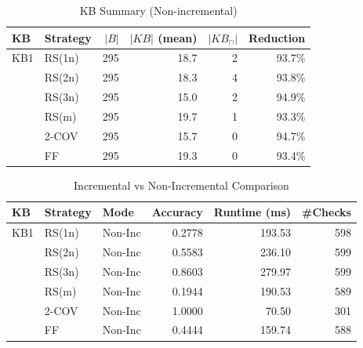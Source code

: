 \begin{table}[htbp]
\centering
\caption{KB Summary (Non-incremental)}
\label{tab:kb_summary_non-incremental}
\begin{tabular}{llrrrr}
\toprule
KB & Strategy & $|B|$ & $|KB|$ (mean) & $|KB_{\cap}|$ & Reduction \\
\midrule
KB1 & RS(1n) & 295 & 18.7 & 2 & 93.7\% \\
 & RS(2n) & 295 & 18.3 & 4 & 93.8\% \\
 & RS(3n) & 295 & 15.0 & 2 & 94.9\% \\
 & RS(m) & 295 & 19.7 & 1 & 93.3\% \\
 & 2-COV & 295 & 15.7 & 0 & 94.7\% \\
 & FF & 295 & 19.3 & 0 & 93.4\% \\
\bottomrule
\end{tabular}
\end{table}

\begin{table}[htbp]
\centering
\caption{Incremental vs Non-Incremental Comparison}
\label{tab:inc_vs_noninc}
\begin{tabular}{lllrrr}
\toprule
KB & Strategy & Mode & Accuracy & Runtime (ms) & \#Checks \\
\midrule
KB1 & RS(1n) & Non-Inc & 0.2778 & 193.53 & 598 \\
 & RS(2n) & Non-Inc & 0.5583 & 236.10 & 599 \\
 & RS(3n) & Non-Inc & 0.8603 & 279.97 & 599 \\
 & RS(m) & Non-Inc & 0.1944 & 190.53 & 589 \\
 & 2-COV & Non-Inc & 1.0000 & 70.50 & 301 \\
 & FF & Non-Inc & 0.4444 & 159.74 & 588 \\
\bottomrule
\end{tabular}
\end{table}